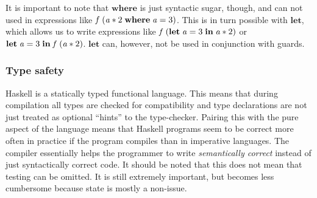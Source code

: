 \documentclass[paper=A4,twoside=true,openright,parskip=full,chapterprefix=true,headings=normal,bibliography=totoc,listof=totoc,titlepage=on,captions=tableabove,draft=false,british]{scrreprt}%
\renewcommand{\enquote}[1]{{``}#1{''}}
\begin{document}
\begin{hscode}\SaveRestoreHook
{}%
%
%
\>[B]{}\mathbin{::}\to {}\to {}\<[E]%
\\
\>[B]{}\;\;\<[E]%
\\
\>[B]{}\<[5]%
\>[5]{}\mid {}\mathbin{>}\mathrel{=}\<[E]%
\\
\>[B]{}\<[5]%
\>[5]{}\mid {}\equiv {}\mathrel{=}\<[E]%
\\
\>[B]{}\<[5]%
\>[5]{}\mid {}\mathrel{=}\<[E]%
\\
\>[B]{}\<[5]%
\>[5]{}\;\mathrel{=}\mathbin{/}\<[E]%
\ColumnHook
\end{hscode}\resethooks
\vspace{-2\baselineskip}

It is important to note that \ensuremath{\mathbf{where}} is just syntactic sugar, though,
and can not used in expressions like \ensuremath{\Varid{f}\;(\Varid{a}\mathbin{*}\mathrm{2}\;\mathbf{where}\;\Varid{a}\mathrel{=}\mathrm{3})}. This is in
turn possible with \ensuremath{\mathbf{let}}, which allows us to write expressions like
\ensuremath{\Varid{f}\;(\mathbf{let}\;\Varid{a}\mathrel{=}\mathrm{3}\;\mathbf{in}\;\Varid{a}\mathbin{*}\mathrm{2})} or \ensuremath{\mathbf{let}\;\Varid{a}\mathrel{=}\mathrm{3}\;\mathbf{in}\;\Varid{f}\;(\Varid{a}\mathbin{*}\mathrm{2})}. \ensuremath{\mathbf{let}} can,
however, not be used in conjunction with guards.

\hypertarget{type-safety}{%
\subsubsection{Type safety}\label{type-safety}}

Haskell is a statically typed functional language. This means that
during compilation all types are checked for compatibility and type
declarations are not just treated as optional \enquote{hints} to the
type-checker. Pairing this with the pure aspect of the language means
that Haskell programs seem to be correct more often in practice if the
program compiles than in imperative languages. The compiler essentially
helps the programmer to write \emph{semantically correct} instead of
just syntactically correct code. It should be noted that this does not
mean that testing can be omitted. It is still extremely important, but
becomes less cumbersome because state is mostly a non-issue.
\end{document}
